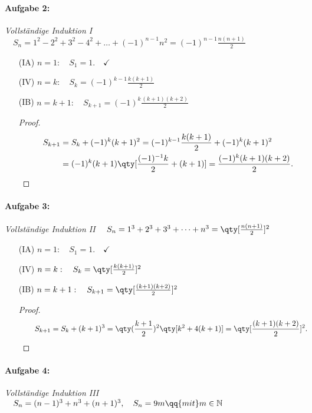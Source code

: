 \paragraph{Aufgabe 2: } \emph{Vollständige Induktion I} $\quad S_n = 1^2 -2^2 + 3^2 -4^2 + \hdots + (-1)^{n-1}n^2 = (-1)^{n-1}\frac{n(n+1)}{2}$
\begin{enumerate}
    \item[(IA)] $n=1: \quad S_1 = 1. \quad\checkmark$ 
    \item[(IV)] $n=k: \quad S_k=(-1)^{k-1}\frac{k(k+1)}{2}$
    \item[(IB)] $n=k+1: \quad S_{k+1}=(-1)^{k}\frac{(k+1)(k+2)}{2}$
    \begin{proof}$~$\\[-1.5cm]
        \begin{align}
            \qquad S_{k+1} &= S_k + (-1)^k (k+1)^2 =(-1)^{k-1}\frac{k(k+1)}{2}+(-1)^k(k+1)^2\\
            &=(-1)^k(k+1)\qty[\frac{(-1)^{-1}k}{2}+(k+1)]=\frac{(-1)^{k}(k+1)(k+2)}{2}.
        \end{align}
    \end{proof}
\end{enumerate}
%
\paragraph{Aufgabe 3: } \emph{Vollständige Induktion II} $\quad S_n=1^3+2^3+3^3+\dots+n^3 = \qty[\frac{n(n+1)}{2}]^2$

\begin{enumerate}
    \item[(IA)] $n=1: \quad S_1 = 1. \quad\checkmark$ 
    \item[(IV)] $n=k: \quad S_k=\qty[\frac{k(k+1)}{2}]^2$
    \item[(IB)] $n=k+1: \quad S_{k+1}=\qty[\frac{(k+1)(k+2)}{2}]^2$\\
    \begin{proof}$~$\\[-1.7cm]
        \begin{align}
            \qquad S_{k+1} &= S_k+(k+1)^3=\qty(\frac{k+1}{2})^2\qty[k^2+4(k+1)]=\qty[\frac{(k+1)(k+2)}{2}]^2.
        \end{align}
    \end{proof}
\end{enumerate}
%

\paragraph{Aufgabe 4: } \emph{Vollständige Induktion III} $\quad S_n = (n-1)^3 + n^3 + (n+1)^3, \quad S_n = 9m \qq{mit} m \in \mathbb{N}$


